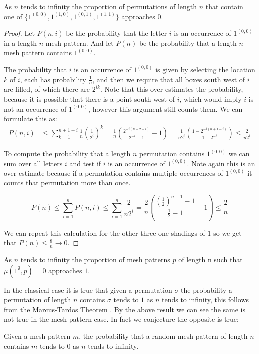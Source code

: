 \documentclass[11pt,a4paper,oneside]{article}
\begin{document}
\begin{lem}
As $n$ tends to infinity the proportion of permutations of length $n$ that contain one of
$\{1^{(0,0)},1^{(1,0)},1^{(0,1)},1^{(1,1)}\}$ approaches $0$.
\begin{proof}
Let $P(n,i)$ be the probability that the letter $i$ is an occurrence of
$1^{(0,0)}$ in a length $n$ mesh pattern. And let $P(n)$ be the probability
that a length $n$ mesh pattern contains $1^{(0,0)}$.

The probability that $i$ is an occurrence of $1^{(0,0)}$ is given by selecting
the location $k$ of $i$, each has probability $\frac{1}{n}$, and then we require
that all boxes south west of $i$ are filled, of which there are $2^{ik}$. Note
that this over estimates the probability, because it is possible that there is a
point south west of $i$, which would imply $i$ is not an occurrence of
$1^{(0,0)}$, however this argument still counts them. We can formulate this as:
\begin{align*}
P(n,i)&\le\sum_{k=1}^{n+1-i}\frac{1}{n}\left(\frac{1}{2^i}\right)^k
=\frac{1}{n}\left(\frac{2^{-i(n+2-i)}}{2^{-i}-1}-1\right)
=\frac{1}{n2^i}\left(\frac{1-2^{-i(n+1-i)}}{1-2^{-i}}\right)
\le\frac{2}{n2^i}
\end{align*}

To compute the probability that a length $n$ permutation contains $1^{(0,0)}$ we
can sum over all letters $i$ and test if $i$ is an occurrence of $1^{(0,0)}$.
Note again this is an over estimate because if a permutation contains multiple
occurrences of $1^{(0,0)}$ it counts that permutation more than once.

$$
P(n)\le\sum_{i=1}^{n}P(n,i)\le\sum_{i=1}^{n}\frac{2}{n2^i}
=\frac{2}{n}\left(\frac{\left(\frac{1}{2}\right)^{n+1}-1}{\frac{1}{2}-1}-1\right)
\le\frac{2}{n}
$$

We can repeat this calculation for the other three one shadings of $1$ so we get
that $P(n)\le \frac{8}{n}\rightarrow 0$.
\end{proof}
\end{lem}
\begin{cor}
As $n$ tends to infinity the proportion of mesh patterns $p$ of length n such
that $\mu(1^\emptyset,p)=0$ approaches $1$.
\end{cor}


In the classical case it is true that given a permutation $\sigma$ the
probability a permutation of length $n$ contains $\sigma$ tends to $1$ as $n$
tends to infinity, this follows from the Marcus-Tardos Theorem \cite{MT04}. By
the above result we can see the same is not true in the mesh pattern case. In
fact we conjecture the opposite is true:
\begin{conj}
Given a mesh pattern $m$, the probability that a random mesh pattern of length
$n$ contains $m$ tends to $0$ as $n$ tends to infinity.
\end{conj}
\end{document}
